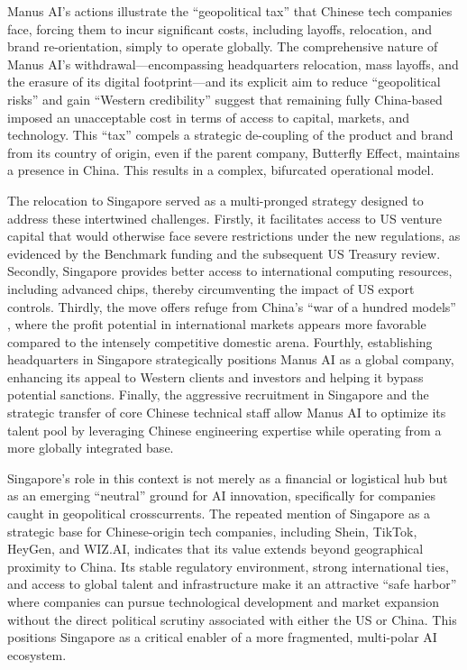 Manus AI's actions illustrate the ``geopolitical tax'' that Chinese tech companies face, forcing them to incur significant costs, including layoffs, relocation, and brand re-orientation, simply to operate globally.
The comprehensive nature of Manus AI's withdrawal—encompassing headquarters relocation, mass layoffs, and the erasure of its digital footprint—and its explicit aim to reduce ``geopolitical risks'' and gain ``Western credibility'' suggest that remaining fully China-based imposed an unacceptable cost in terms of access to capital, markets, and technology.
This ``tax'' compels a strategic de-coupling of the product and brand from its country of origin, even if the parent company, Butterfly Effect, maintains a presence in China.
This results in a complex, bifurcated operational model.

The relocation to Singapore served as a multi-pronged strategy designed to address these intertwined challenges.
Firstly, it facilitates access to US venture capital that would otherwise face severe restrictions under the new regulations, as evidenced by the Benchmark funding and the subsequent US Treasury review.
Secondly, Singapore provides better access to international computing resources, including advanced chips, thereby circumventing the impact of US export controls.
Thirdly, the move offers refuge from China's ``war of a hundred models'' \cite{perplexity_china_hundred_models}, where the profit potential in international markets appears more favorable compared to the intensely competitive domestic arena.
Fourthly, establishing headquarters in Singapore strategically positions Manus AI as a global company, enhancing its appeal to Western clients and investors and helping it bypass potential sanctions.
Finally, the aggressive recruitment in Singapore and the strategic transfer of core Chinese technical staff allow Manus AI to optimize its talent pool by leveraging Chinese engineering expertise while operating from a more globally integrated base.

Singapore's role in this context is not merely as a financial or logistical hub but as an emerging ``neutral'' ground for AI innovation, specifically for companies caught in geopolitical crosscurrents.
The repeated mention of Singapore as a strategic base for Chinese-origin tech companies, including Shein, TikTok, HeyGen, and WIZ.AI, indicates that its value extends beyond geographical proximity to China.
Its stable regulatory environment, strong international ties, and access to global talent and infrastructure make it an attractive ``safe harbor'' where companies can pursue technological development and market expansion without the direct political scrutiny associated with either the US or China.
This positions Singapore as a critical enabler of a more fragmented, multi-polar AI ecosystem.

